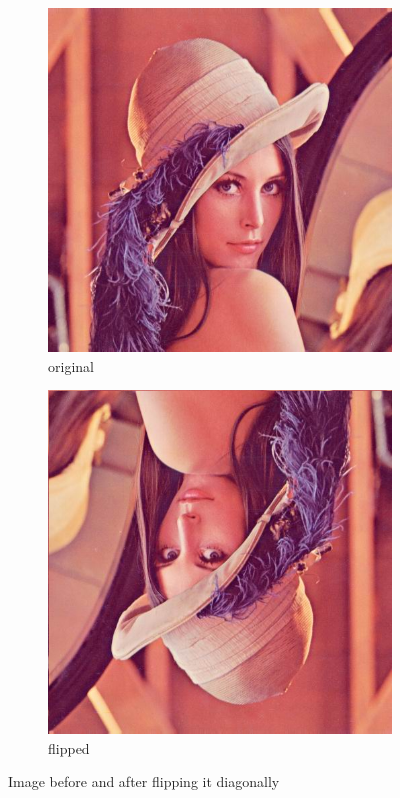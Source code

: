 \documentclass[12pt]{article}
\begin{document}
\begin{figure}[H]\centering
    \begin{subfigure}[t]{\subfiguresize}\centering
        \includegraphics[width=\textwidth]{lenac.png}
        \caption{original}
    \end{subfigure}
    \hspace{.05\textwidth}
    \begin{subfigure}[t]{\subfiguresize}\centering
        \includegraphics[width=\textwidth]{lenac_dflip.png}
        \caption{flipped}
    \end{subfigure}
    \caption{Image before and after flipping it diagonally}
\end{figure}
\end{document}
